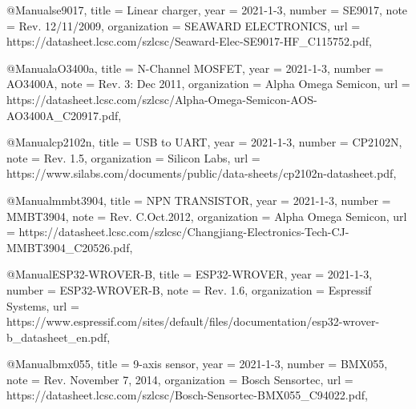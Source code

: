 @Manual{se9017,
    title        = {Linear charger},
    year         = {2021-1-3},
    number       = {SE9017},
    note         = {Rev. 12/11/2009},
    organization = {SEAWARD ELECTRONICS},
    url          = {https://datasheet.lcsc.com/szlcsc/Seaward-Elec-SE9017-HF_C115752.pdf},
}

@Manual{aO3400a,
    title        = {N-Channel MOSFET},
    year         = {2021-1-3},
    number       = {AO3400A},
    note         = {Rev. 3: Dec 2011},
    organization = {Alpha Omega Semicon},
    url          = {https://datasheet.lcsc.com/szlcsc/Alpha-Omega-Semicon-AOS-AO3400A_C20917.pdf},
}

@Manual{cp2102n,
    title        = {USB to UART},
    year         = {2021-1-3},
    number       = {CP2102N},
    note         = {Rev. 1.5},
    organization = {Silicon Labs},
    url          = {https://www.silabs.com/documents/public/data-sheets/cp2102n-datasheet.pdf},
}

@Manual{mmbt3904,
    title        = {NPN TRANSISTOR},
    year         = {2021-1-3},
    number       = {MMBT3904},
    note         = {Rev. C.Oct.2012},
    organization = {Alpha Omega Semicon},
    url          = {https://datasheet.lcsc.com/szlcsc/Changjiang-Electronics-Tech-CJ-MMBT3904_C20526.pdf},
}

@Manual{ESP32-WROVER-B,
    title        = {ESP32-WROVER},
    year         = {2021-1-3},
    number       = {ESP32-WROVER-B},
    note         = {Rev.  1.6},
    organization = {Espressif Systems},
    url          = {https://www.espressif.com/sites/default/files/documentation/esp32-wrover-b_datasheet_en.pdf},
}

@Manual{bmx055,
    title        = {9-axis sensor},
    year         = {2021-1-3},
    number       = {BMX055},
    note         = {Rev.  November 7, 2014},
    organization = {Bosch Sensortec},
    url          = {https://datasheet.lcsc.com/szlcsc/Bosch-Sensortec-BMX055_C94022.pdf},
}

